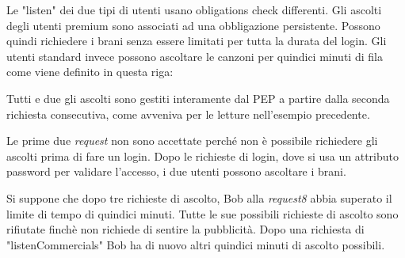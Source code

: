 Le "listen" dei due tipi di utenti usano obligations check differenti. Gli ascolti degli utenti premium sono associati
ad una obbligazione persistente. Possono quindi richiedere i brani senza essere limitati per tutta la durata del login.
Gli utenti standard invece possono ascoltare le canzoni per quindici minuti di fila come viene definito in questa riga:

Tutti e due gli ascolti sono gestiti interamente dal \ac{PEP} a partire dalla seconda richiesta consecutiva, come avveniva per
le letture nell'esempio precedente.

Le prime due \emph{request} non sono accettate perché non è possibile richiedere gli ascolti prima di fare un login.
Dopo le richieste di login, dove si usa un attributo password per validare l'accesso, i due utenti possono ascoltare i brani.

Si suppone che dopo tre richieste di ascolto, Bob alla \emph{request8} abbia superato il limite di tempo di quindici minuti.
Tutte le sue possibili richieste di ascolto sono rifiutate finchè non richiede di sentire la pubblicità. Dopo una richiesta
di "listenCommercials" Bob ha di nuovo altri quindici minuti di ascolto possibili.

